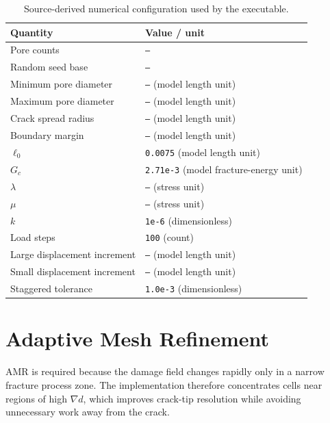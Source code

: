 \documentclass[11pt,a4paper]{report}
\begin{document}
\begin{table}[H]
\centering
\caption{Source-derived numerical configuration used by the executable.}
\begin{tabular}{ll}
\toprule
Quantity & Value / unit\\
\midrule
Pore counts & \texttt{--}\\
Random seed base & \texttt{--}\\
Minimum pore diameter & \texttt{--} (model length unit)\\
Maximum pore diameter & \texttt{--} (model length unit)\\
Crack spread radius & \texttt{--} (model length unit)\\
Boundary margin & \texttt{--} (model length unit)\\
$\ell_0$ & \texttt{0.0075} (model length unit)\\
$G_c$ & \texttt{2.71e-3} (model fracture-energy unit)\\
$\lambda$ & \texttt{--} (stress unit)\\
$\mu$ & \texttt{--} (stress unit)\\
$k$ & \texttt{1e-6} (dimensionless)\\
Load steps & \texttt{100} (count)\\
Large displacement increment & \texttt{--} (model length unit)\\
Small displacement increment & \texttt{--} (model length unit)\\
Staggered tolerance & \texttt{1.0e-3} (dimensionless)\\
\bottomrule
\end{tabular}
\end{table}

\chapter{Adaptive Mesh Refinement}
AMR is required because the damage field changes rapidly only in a narrow fracture process zone. The implementation therefore concentrates cells near regions of high $\nabla d$, which improves crack-tip resolution while avoiding unnecessary work away from the crack.
\end{document}
